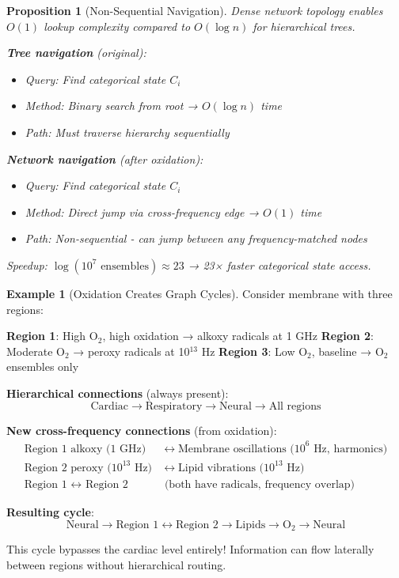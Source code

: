 \documentclass[11pt,a4paper]{article}
\newtheorem{proposition}[theorem]{Proposition}
\theoremstyle{definition}
\newtheorem{example}[theorem]{Example}
\theoremstyle{remark}
\begin{document}
\begin{proposition}[Non-Sequential Navigation]
Dense network topology enables $O(1)$ lookup complexity compared to $O(\log n)$ for hierarchical trees.

\textbf{Tree navigation} (original):
\begin{itemize}
\item Query: Find categorical state $C_i$
\item Method: Binary search from root → $O(\log n)$ time
\item Path: Must traverse hierarchy sequentially
\end{itemize}

\textbf{Network navigation} (after oxidation):
\begin{itemize}
\item Query: Find categorical state $C_i$
\item Method: Direct jump via cross-frequency edge → $O(1)$ time
\item Path: Non-sequential - can jump between any frequency-matched nodes
\end{itemize}

Speedup: $\log(10^7 \text{ ensembles}) \approx 23$ → 23× faster categorical state access.
\end{proposition}

\begin{example}[Oxidation Creates Graph Cycles]
Consider membrane with three regions:

\textbf{Region 1}: High O$_2$, high oxidation → alkoxy radicals at 1 GHz
\textbf{Region 2}: Moderate O$_2$ → peroxy radicals at 10$^{13}$ Hz  
\textbf{Region 3}: Low O$_2$, baseline → O$_2$ ensembles only

\textbf{Hierarchical connections} (always present):
\begin{equation}
\text{Cardiac} \to \text{Respiratory} \to \text{Neural} \to \text{All regions}
\end{equation}

\textbf{New cross-frequency connections} (from oxidation):
\begin{align}
\text{Region 1 alkoxy (1 GHz)} &\leftrightarrow \text{Membrane oscillations (10}^6 \text{ Hz, harmonics)} \\
\text{Region 2 peroxy (10}^{13} \text{ Hz)} &\leftrightarrow \text{Lipid vibrations (10}^{13} \text{ Hz)} \\
\text{Region 1 }\leftrightarrow \text{ Region 2} &\text{ (both have radicals, frequency overlap)}
\end{align}

\textbf{Resulting cycle}:
\begin{equation}
\text{Neural} \to \text{Region 1} \leftrightarrow \text{Region 2} \to \text{Lipids} \to \text{O}_2 \to \text{Neural}
\end{equation}

This cycle bypasses the cardiac level entirely! Information can flow laterally between regions without hierarchical routing.
\end{example}
\end{document}
